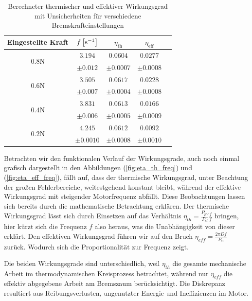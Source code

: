 \begin{table}[H]
  \centering
  \begin{tabular}{c c c c c}
  \toprule
  \textbf{Eingestellte Kraft} & \boldmath$f\,\qty[\si{\per\second}]$ & \boldmath$\eta_{\text{th}}$ & \boldmath$\eta_{\text{eff}}$ \\
  \midrule
  \multirow{2}{*}{\boldmath$0.8\si{\newton}$} & $3.194$& $0.0604$ & $0.0277$ \\
   & $\pm 0.012$ & $\pm 0.0007$ & $\pm 0.0008$ \\
  \midrule
  \multirow{2}{*}{\boldmath$0.6\si{\newton}$} & $3.505$ & $0.0617$ & $0.0228$ \\
   & $\pm 0.007$ & $\pm 0.0004$ & $\pm 0.0008$ \\
  \midrule
  \multirow{2}{*}{\boldmath$0.4\si{\newton}$} &  $3.831$& $0.0613$ & $0.0166$ \\
   &  $\pm 0.006$& $\pm 0.0005$ & $\pm 0.0009$ \\
  \midrule
  \multirow{2}{*}{\boldmath$0.2\si{\newton}$} &  $4.245$& $0.0612$ & $0.0092$ \\
   &  $\pm 0.0010$ & $\pm 0.0008$ & $\pm 0.0010$ \\
  \bottomrule
  \end{tabular}
  \label{tab:werte_gebremst_kurz}
  \caption{Berechneter thermischer und effektiver Wirkungsgrad mit Unsicherheiten für verschiedene Bremskrafteinstellungen}
\end{table}
Betrachten wir den funktionalen Verlauf der Wirkungsgrade, auch noch einmal grafisch dargestellt in den Abbildungen (\ref{fig:eta_th_freq}) und (\ref{fig:eta_eff_freq}), fällt auf, dass der thermische Wirkungsgrad, unter Beachtung der großen Fehlerbereiche, weitestgehend konstant bleibt, während der effektive Wirkungsgrad mit steigender Motorfrequenz abfällt. Diese Beobachtungen lassen sich bereits durch die mathematische Betrachtung erklären. Der thermische Wirkungsgrad lässt sich durch Einsetzen auf das Verhältnis $\eta_{th} = \frac{P_{pV}}{P_{el}} \frac{f}{f}$ bringen, hier kürzt sich die Frequenz $f$ also heraus, was die Unabhängigkeit von dieser erklärt. Den effektiven Wirkungsgrad führen wir auf den Bruch $\eta_{eff} = \frac{2 \pi D f}{P_{el}}$ zurück. Wodurch sich die Proportionalität zur Frequenz zeigt.

Die beiden Wirkungsgrade sind unterschiedlich, weil $\eta_{th}$ die gesamte mechanische Arbeit im thermodynamischen Kreisprozess betrachtet, während nur $\eta_{eff}$ die effektiv abgegebene Arbeit am Bremszaum berücksichtigt. Die Diskrepanz resultiert aus Reibungsverlusten, ungenutzter Energie und Ineffizienzen im Motor.